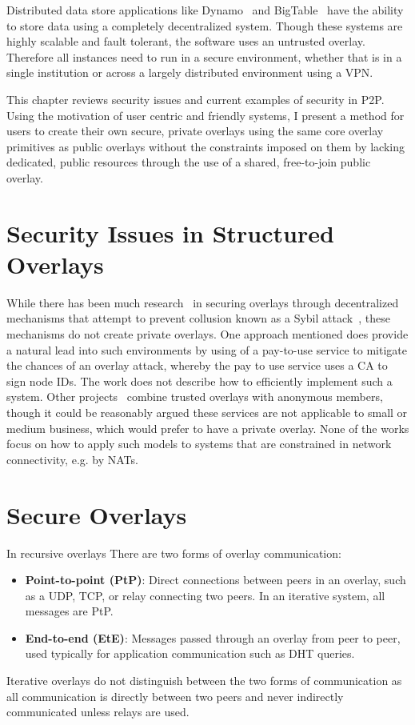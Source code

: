 Distributed data store applications like Dynamo~\cite{dynamo} and
BigTable~\cite{bigtable} have the ability to store data using a completely
decentralized system.  Though these systems are highly scalable and fault
tolerant, the software uses an untrusted overlay.  Therefore all instances
need to run in a secure environment, whether that is in a single institution
or across a largely distributed environment using a VPN.

This chapter reviews security issues and current examples of security in P2P.
Using the motivation of user centric and friendly systems, I present a method
for users to create their own secure, private overlays using the same core
overlay primitives as public overlays without the constraints imposed on them
by lacking dedicated, public resources through the use of a shared,
free-to-join public overlay.

\section{Security Issues in Structured Overlays}
While there has been much research~\cite{secure_routing} in securing overlays
through decentralized mechanisms that attempt to prevent collusion known as
a Sybil attack~\cite{sybil}, these mechanisms do not create private overlays.
One approach mentioned does provide a natural lead into such
environments by using of a pay-to-use service to mitigate the chances
of an overlay attack, whereby the pay to use service uses a CA to sign node
IDs.  The work does not describe how to efficiently implement such a system.
Other projects~\cite{stone, tor} combine trusted overlays
with anonymous members, though it could be reasonably argued these services are
not applicable to small or medium business, which would prefer to have a private
overlay.  None of the works focus on how to apply such models to
systems that are constrained in network connectivity, e.g. by NATs.

\section{Secure Overlays}
\label{secure_overlays}
In recursive overlays There are two forms of overlay communication:
\begin{itemize}
\item \textbf{Point-to-point (PtP)}:  Direct connections between peers in an
overlay, such as a UDP, TCP, or relay connecting two peers.  In an iterative
system, all messages are PtP.
\item \textbf{End-to-end (EtE)}:  Messages passed through an overlay from
peer to peer, used typically for application communication such as DHT queries.
\end{itemize}
Iterative overlays do not distinguish between the two forms of communication as
all communication is directly between two peers and never indirectly
communicated unless relays are used.


